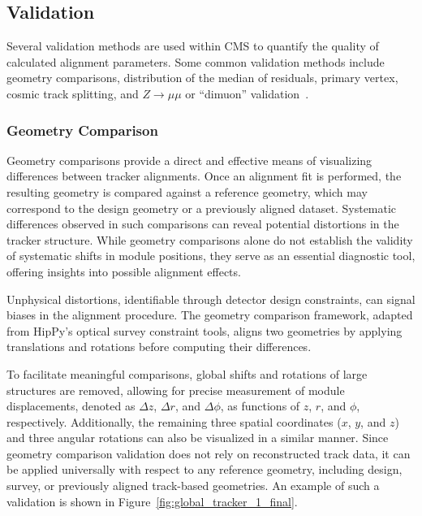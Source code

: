 \subsection{Validation}

Several validation methods are used within CMS to quantify the quality of calculated alignment parameters. Some common validation methods include geometry comparisons, distribution of the median of residuals, primary vertex, cosmic track splitting, and $Z\to\mu\mu$ or ``dimuon'' validation~\cite{2022166795}.

\subsubsection{Geometry Comparison}

Geometry comparisons provide a direct and effective means of visualizing differences between tracker alignments. Once an alignment fit is performed, the resulting geometry is compared against a reference geometry, which may correspond to the design geometry or a previously aligned dataset. Systematic differences observed in such comparisons can reveal potential distortions in the tracker structure. While geometry comparisons alone do not establish the validity of systematic shifts in module positions, they serve as an essential diagnostic tool, offering insights into possible alignment effects.

Unphysical distortions, identifiable through detector design constraints, can signal biases in the alignment procedure. The geometry comparison framework, adapted from HipPy’s optical survey constraint tools, aligns two geometries by applying translations and rotations before computing their differences. 

To facilitate meaningful comparisons, global shifts and rotations of large structures are removed, allowing for precise measurement of module displacements, denoted as \( \Delta z \), \( \Delta r \), and \( \Delta \phi \), as functions of \( z \), \( r \), and \( \phi \), respectively. Additionally, the remaining three spatial coordinates (\( x \), \( y \), and \( z \)) and three angular rotations can also be visualized in a similar manner. Since geometry comparison validation does not rely on reconstructed track data, it can be applied universally with respect to any reference geometry, including design, survey, or previously aligned track-based geometries. An example of such a validation is shown in Figure~\ref{fig:global_tracker_1_final}.

